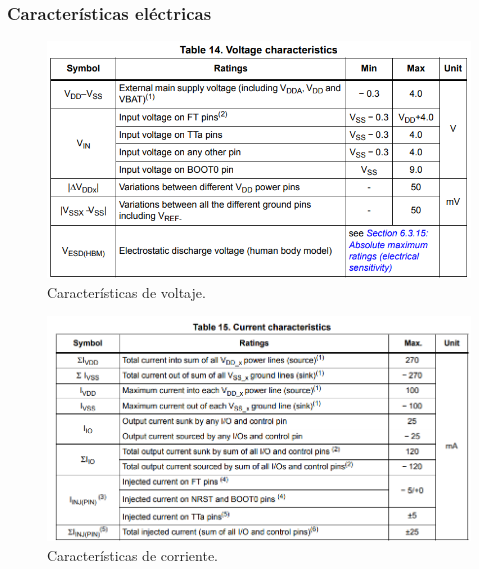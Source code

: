 \subsubsection{Características eléctricas}
\begin{figure}[H]
    \centering
    \includegraphics[scale=0.7]{images/Carac_Volt.png}
    \caption{Características de voltaje. \cite{STM32F429xxDatasheet}}
    \label{fig:car_vol}
\end{figure}
\begin{figure}[H]
    \centering
    \includegraphics[scale=0.7]{images/Carac_Corr.png}
    \caption{Características de corriente. \cite{STM32F429xxDatasheet}}
    \label{fig:car_cor}
\end{figure}
